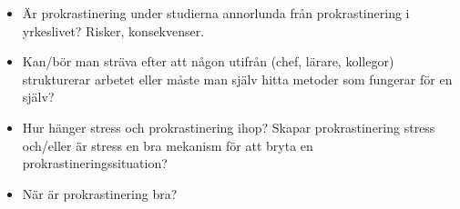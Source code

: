 \begin{frame}
  \begin{question}
    \begin{itemize}
      \item Är prokrastinering under studierna annorlunda från prokrastinering 
        i yrkeslivet? Risker, konsekvenser.
    \end{itemize}
  \end{question}
\end{frame}

\begin{frame}
  \begin{question}
    \begin{itemize}
      \item Kan/bör man sträva efter att någon utifrån (chef, lärare, kollegor) 
        strukturerar arbetet eller måste man själv hitta metoder som fungerar 
        för en själv?
    \end{itemize}
  \end{question}
\end{frame}

\begin{frame}
  \begin{question}
    \begin{itemize}
      \item Hur hänger stress och prokrastinering ihop? Skapar prokrastinering 
        stress och/eller är stress en bra mekanism för att bryta en 
        prokrastineringssituation?
    \end{itemize}
  \end{question}
\end{frame}

\begin{frame}
  \begin{question}
    \begin{itemize}
      \item När är prokrastinering bra?
    \end{itemize}
  \end{question}
\end{frame}
